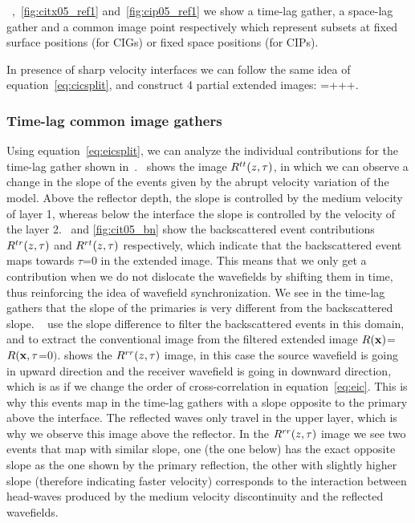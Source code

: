 ~,~\ref{fig:citx05_ref1} and~\ref{fig:cip05_ref1} we show a time-lag gather, a space-lag gather
 and a common image point respectively which represent subsets at fixed surface positions (for CIGs) or fixed space positions 
(for CIPs).

In presence of sharp velocity interfaces we can follow the same idea of equation~\ref{eq:cicsplit}, and construct 4 partial 
extended images:
\beq
\Re=+++.
\label{eq:eicsplit}
\eeq



\subsubsection{Time-lag common image gathers}

Using equation~\ref{eq:eicsplit}, we can analyze the individual contributions
for the time-lag gather shown in~.~ shows the image $R^{tt}(z,\tau)$,
in which we can observe a change in the slope of the events given by the abrupt velocity variation of the model. 
%
Above the reflector depth, the slope is controlled by the medium velocity of layer 1, whereas below the interface the slope is controlled
 by the velocity of the layer 2.~ and \ref{fig:cit05_bn} show the backscattered
 event contributions $R^{tr}(z,\tau)$ and $R^{rt}(z,\tau)$ respectively, which indicate that the backscattered event maps towards $\tau$=$0$
in the extended image. This means that we only get a contribution when we do not dislocate the wavefields by shifting them in time, 
thus reinforcing the idea of wavefield synchronization. We see in the time-lag gathers that the slope of the primaries is very different
from the backscattered slope. ~\cite{kaelin:3125} use the slope difference to filter the backscattered 
events in this domain, and to extract the conventional image from the filtered extended image $R({\bf x})$=$R({\bf x},\tau$=$0)$. 
%
%
 shows the $R^{rr}(z,\tau)$ image, in this case the source wavefield is going in upward
direction and the receiver wavefield is going in downward direction, which is as if we change the order of cross-correlation in
equation~\ref{eq:eic}. This is why this events map in the time-lag gathers with a slope opposite to the primary above the
interface. The reflected waves only travel in the upper layer, which is why we observe this image above the reflector. In the $R^{rr}(z,\tau)$
image we see two events that map with similar slope, one (the one below) has the exact opposite slope as the one shown by the primary reflection,
the other with slightly higher slope (therefore indicating faster velocity) corresponds to the interaction between head-waves produced by 
the medium velocity discontinuity and the reflected wavefields.

